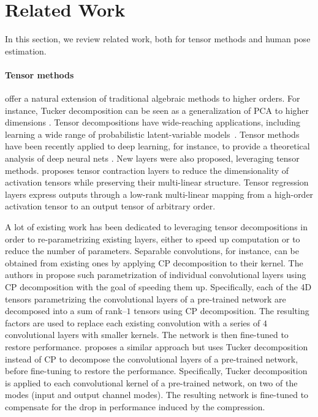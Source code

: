 \documentclass[10pt,twocolumn,letterpaper]{article}
\begin{document}
\section{Related Work}

In this section, we review related work, both for tensor methods and human pose estimation. 

\paragraph{Tensor methods} offer a natural extension of traditional algebraic methods to higher orders. For instance, Tucker decomposition can be seen as a generalization of PCA to higher dimensions \cite{tensor_decomposition_kolda}. Tensor decompositions have wide-reaching applications, including learning a wide range of probabilistic latent-variable models~\cite{decomposition_latent_anandkumar}.
Tensor methods have been recently applied to deep learning, for instance, to provide a theoretical analysis of deep neural nets \cite{expressive_deep_tensor}. New layers were also proposed, leveraging tensor methods. \cite{kossaifi2017tensor} proposes tensor contraction layers to reduce the dimensionality of activation tensors while preserving their multi-linear structure. Tensor regression layers  \cite{kossaifi2018tensor} express outputs through a low-rank multi-linear mapping from a high-order activation tensor to an output tensor of arbitrary order.

A lot of existing work has been dedicated to leveraging tensor decompositions in order to re-parametrizing existing layers, either to speed up computation or to reduce the number of parameters. Separable convolutions, for instance, can be obtained from existing ones by applying CP decomposition to their kernel. The authors in \cite{lebedev2014speeding} propose such parametrization of individual convolutional layers using CP decomposition with the goal of speeding them up. Specifically, each of the 4D tensors parametrizing the convolutional layers of a pre-trained network are decomposed into a sum of rank--\(1\) tensors using CP decomposition. The resulting factors are used to replace each existing convolution with a series of \(4\) convolutional layers with smaller kernels. The network is then fine-tuned to restore performance. 
\cite{yong2015compression} proposes a similar approach but uses Tucker decomposition instead of CP to decompose the convolutional layers of a pre-trained network, before fine-tuning to restore the performance. Specifically, Tucker decomposition is applied to each convolutional kernel of a pre-trained network, on two of the modes (input and output channel modes). The resulting network is fine-tuned to compensate for the drop in performance induced by the compression.
\end{document}
